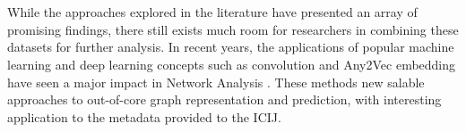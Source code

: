 \documentclass[a4paper,latin]{paper}
\begin{document}
\\
\\
While the approaches explored in the literature have presented an array of promising findings, there still exists much room for researchers in combining these datasets for further analysis.  In recent years, the applications of popular machine learning and deep learning concepts such as convolution and Any2Vec embedding have seen a major impact in Network Analysis \citep{Hamilton2017, Pal2016}.  These methods new salable approaches to out-of-core graph representation and prediction, with interesting application to the metadata provided to the ICIJ.    


\\

\end{document}
